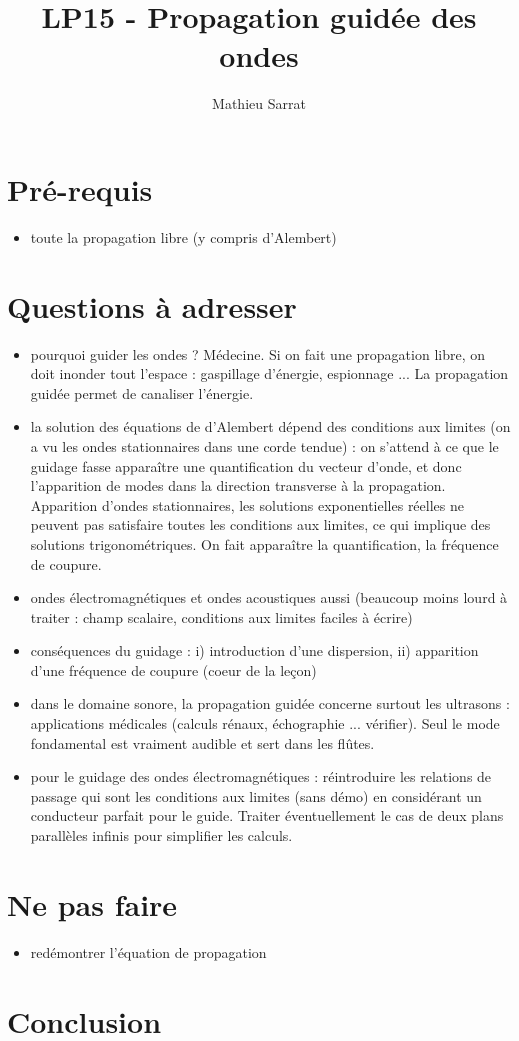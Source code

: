 \documentclass[11pt,a4paper]{report}
\author{Mathieu Sarrat}
\title{LP15 - Propagation guidée des ondes}
\begin{document}
\maketitle

\section{Pré-requis}
\begin{itemize}
	\item toute la propagation libre (y compris d'Alembert)
\end{itemize}

\section{Questions à adresser}
\begin{itemize}
	\item pourquoi guider les ondes ? Médecine. Si on fait une propagation libre, on doit inonder tout l'espace : gaspillage d'énergie, espionnage ... La propagation guidée permet de canaliser l'énergie.
	\item la solution des équations de d'Alembert dépend des conditions aux limites (on a vu les ondes stationnaires dans une corde tendue) : on s'attend à ce que le guidage fasse apparaître une quantification du vecteur d'onde, et donc l'apparition de modes dans la direction transverse à la propagation. Apparition d'ondes stationnaires, les solutions exponentielles réelles ne peuvent pas satisfaire toutes les conditions aux limites, ce qui implique des solutions trigonométriques. On fait apparaître la quantification, la fréquence de coupure.
	\item ondes électromagnétiques et ondes acoustiques aussi (beaucoup moins lourd à traiter : champ scalaire, conditions aux limites faciles à écrire)
	\item conséquences du guidage : i) introduction d'une dispersion, ii) apparition d'une fréquence de coupure (coeur de la leçon)
	\item dans le domaine sonore, la propagation guidée concerne surtout les ultrasons : applications médicales (calculs rénaux, échographie ... vérifier). Seul le mode fondamental est vraiment audible et sert dans les flûtes.
	\item pour le guidage des ondes électromagnétiques : réintroduire les relations de passage qui sont les conditions aux limites (sans démo) en considérant un conducteur parfait pour le guide. Traiter éventuellement le cas de deux plans parallèles infinis pour simplifier les calculs.
\end{itemize}

\section{Ne pas faire}
\begin{itemize}
	\item redémontrer l'équation de propagation	
\end{itemize}


\section{Conclusion}
\end{document}
